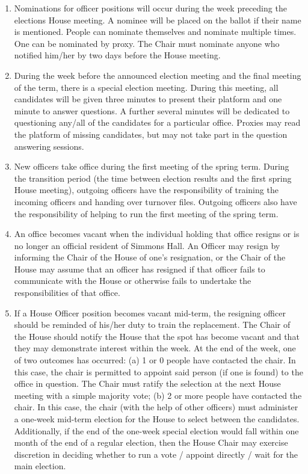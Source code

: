 \documentclass[letterpaper]{article}
\begin{document}
\begin{enumerate}
\begin{enumerate}
\begin{enumerate}
\item Nominations for officer positions will occur during the week preceding the elections House meeting. A nominee will be placed on the ballot if their name is mentioned. People can nominate themselves and nominate multiple times. One can be nominated by proxy. The Chair must nominate anyone who notified him/her by two days before the House meeting.

\item During the week before the announced election meeting and the final meeting of the term, there is a special election meeting. During this meeting, all candidates will be given three minutes to present their platform and one minute to answer questions. A further several minutes will be dedicated to questioning any/all of the candidates for a particular office. Proxies may read the platform of missing candidates, but may not take part in the question answering sessions.

\item New officers take office during the first meeting of the spring term. During the transition period (the time between election results and the first spring House meeting), outgoing officers have the responsibility of training the incoming officers and handing over turnover files. Outgoing officers also have the responsibility of
helping to run the first meeting of the spring term.

\item An office becomes vacant when the individual holding that office resigns or is no longer an official resident of Simmons Hall. An Officer may resign by informing the Chair of the House of one's resignation, or the Chair of the House may assume that an officer has resigned if that officer fails to communicate with the House or otherwise fails to undertake the responsibilities of that office.

\item If a House Officer position becomes vacant mid-term, the resigning officer should be reminded of his/her duty to train the replacement. The Chair of the House should notify the House that the spot has become vacant and that they may demonstrate interest within the week. At the end of the week, one of two outcomes has occurred: (a) 1 or 0 people have contacted the chair. In this case, the chair is permitted to appoint said person (if one is found) to the office in question. The Chair must ratify the selection at the next House meeting with a simple majority vote; (b) 2 or more people have contacted the chair. In this case, the chair (with the help of other officers) must administer a one-week mid-term election for the House to select between the candidates. Additionally, if the end of the one-week special election
would fall within one month of the end of a regular election, then the House Chair may exercise discretion in deciding whether to run a vote / appoint directly / wait for the main election.


\end{enumerate}
\end{enumerate}
\end{enumerate}
\end{document}
